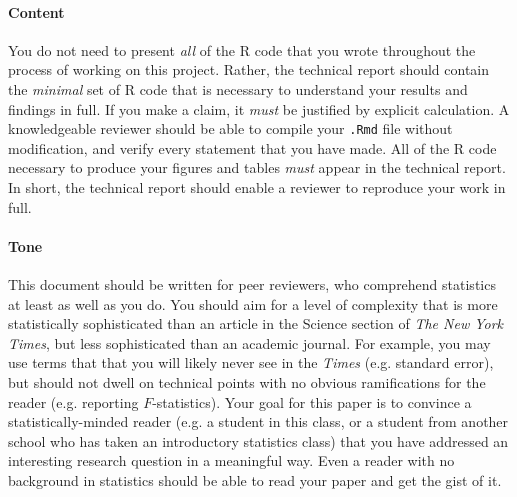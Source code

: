 \documentclass[10pt]{article}
\begin{document}
\paragraph{Content}
You do not need to present \emph{all} of the R code that you wrote throughout the process of working on this project. Rather, the technical report should contain the \emph{minimal} set of R code that is necessary to understand your results and findings in full. If you make a claim, it \emph{must} be justified by explicit calculation. A knowledgeable reviewer should be able to compile your \texttt{.Rmd} file without modification, and verify every statement that you have made. All of the R code necessary to produce your figures and tables \emph{must} appear in the technical report. In short, the technical report should enable a reviewer to reproduce your work in full.
	
\paragraph{Tone} This document should be written for peer reviewers, who comprehend statistics at least as well as you do. You should aim for a level of complexity that is more statistically sophisticated than an article in the Science section of \textit{The New York Times}, but less sophisticated than an academic journal. For example, you may use terms that that you will likely never see in the \textit{Times} (e.g. standard error), but should not dwell on technical points with no obvious ramifications for the reader (e.g. reporting $F$-statistics). Your goal for this paper is to convince a statistically-minded reader (e.g. a student in this class, or a student from another school who has taken an introductory statistics class) that you have addressed an interesting research question in a meaningful way. Even a reader with no background in statistics should be able to read your paper and get the gist of it.
\end{document}
